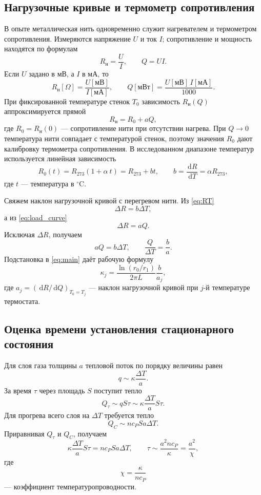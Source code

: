 \documentclass[a4paper,12pt]{article}
\newcommand{\dd}{\,\mathrm{d}}
\begin{document}
\subsection{Нагрузочные кривые и термометр сопротивления}
В опыте металлическая нить одновременно служит нагревателем и термометром сопротивления. Измеряются напряжение $U$ и ток $I$; сопротивление и мощность находятся по формулам
\begin{equation}
R_{\text{н}}=\frac{U}{I},\qquad Q=UI.
\label{eq:RUQ}
\end{equation}
Если $U$ задано в мВ, а $I$ в мА, то
\[
R_{\text{н}}[\Omega]=\frac{U[\text{мВ}]}{I[\text{мА}]},
\qquad
Q[\text{мВт}]=\frac{U[\text{мВ}]\,I[\text{мА}]}{1000}.
\]
При фиксированной температуре стенок $T_0$ зависимость $R_{\text{н}}(Q)$ аппроксимируется прямой
\begin{equation}
R_{\text{н}}=R_0+aQ,
\label{eq:load_curve}
\end{equation}
где $R_0=R_{\text{н}}(0)$ --- сопротивление нити при отсутствии нагрева. При $Q\to0$ температура нити совпадает с температурой стенок, поэтому значения $R_0$ дают калибровку термометра сопротивления. В исследованном диапазоне температур используется линейная зависимость
\begin{equation}
R_0(t)=R_{273}(1+\alpha\ t)=R_{273}+bt,
\qquad b=\frac{\dd R}{\dd T}=\alpha R_{273},
\label{eq:RT}
\end{equation}
где $t$ --- температура в $^\circ\mathrm{C}$.

Свяжем наклон нагрузочной кривой с перегревом нити. Из \eqref{eq:RT}
\[
\Delta R=b\Delta T,
\]
а из \eqref{eq:load_curve}
\[
\Delta R=aQ.
\]
Исключая $\Delta R$, получаем
\[
aQ=b\Delta T,
\qquad
\frac{Q}{\Delta T}=\frac{b}{a}.
\]
Подстановка в \eqref{eq:main} даёт рабочую формулу
\begin{equation}
\boxed{\kappa_j=\frac{\ln(r_0/r_1)}{2\pi L}\frac{b}{a_j}},
\label{eq:kappa_working}
\end{equation}
где $a_j=(\dd R/\dd Q)_{T_0=T_j}$ --- наклон нагрузочной кривой при $j$-й температуре термостата.

\subsection{Оценка времени установления стационарного состояния}
Для слоя газа толщины $a$ тепловой поток по порядку величины равен
\[
q\sim \kappa\frac{\Delta T}{a}.
\]
За время $\tau$ через площадь $S$ поступит тепло
\[
Q_\tau\sim qS\tau\sim \kappa\frac{\Delta T}{a}S\tau.
\]
Для прогрева всего слоя на $\Delta T$ требуется тепло
\[
Q_C\sim n c_P Sa\Delta T.
\]
Приравнивая $Q_\tau$ и $Q_C$, получаем
\[
\kappa\frac{\Delta T}{a}S\tau=n c_P Sa\Delta T,
\qquad
\tau\sim\frac{a^2 n c_P}{\kappa}=\frac{a^2}{\chi},
\]
где
\begin{equation}
\chi=\frac{\kappa}{n c_P}
\label{eq:diffusivity}
\end{equation}
--- коэффициент температуропроводности.
\end{document}
